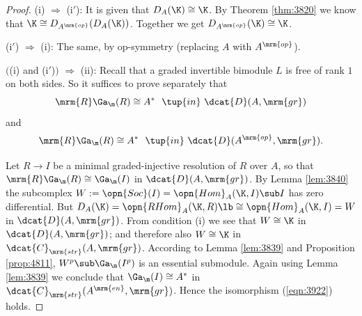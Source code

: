 \begin{proof} \mbox{}

\smallskip \noindent
(i) $\Rightarrow$ (i$'$): 
It is given that $D_A(\K) \cong \K$. 
By Theorem  \ref{thm:3820} we know that
$\K \cong D_{A^{\mrm{op}}}(D_A(\K))$. 
Together we get $D_{A^{\mrm{op}}}(\K) \cong \K$. 

\medskip \noindent 
(i$'$) $\Rightarrow$ (i): The same, by op-symmetry (replacing $A$ with 
$A^{\mrm{op}}$).

\medskip \noindent 
$\bigl($(i) and (i$'$)$\bigr)$ $\Rightarrow$ (ii):
Recall that a graded invertible bimodule $L$ is free of rank $1$ on both sides. 
So it suffices to prove separately that 
\begin{equation} \label{eqn:3922}
\mrm{R} \Ga_{\m}(R) \cong A^* \ \  \tup{in} \ \dcat{D}(A, \mrm{gr}) 
\end{equation}
and
\begin{equation} \label{eqn:3923}
\mrm{R} \Ga_{\m}(R) \cong A^* \ \ \tup{in} \ 
\dcat{D}(A^{\mrm{op}}, \mrm{gr}) .
\end{equation}

Let $R \to I$ be a minimal graded-injective resolution of $R$ over $A$, so that 
$\mrm{R} \Ga_{\m}(R) \cong \Ga_{\m}(I)$
in $\dcat{D}(A, \mrm{gr})$. 
By Lemma \ref{lem:3840} the subcomplex 
$W := \opn{Soc}(I) = \opn{Hom}_{A}(\K, I) \sub I$
has zero differential. But  
$D_A(\K) = \opn{RHom}_A(\K, R) \lb \cong \opn{Hom}_{A}(\K, I) = W$ 
in $\dcat{D}(A, \mrm{gr})$.
From condition (i) we see that $W \cong \K$ in 
$\dcat{D}(A, \mrm{gr})$; and therefore also 
$W \cong \K$ in $\dcat{C}_{\mrm{str}}(A, \mrm{gr})$.
According to Lemma \ref{lem:3839} and Proposition \ref{prop:4811}, 
$W^p \sub \Ga_{\m}(I^p)$ is an essential submodule.
Again using Lemma \ref{lem:3839} we conclude that 
$\Ga_{\m}(I) \cong A^*$ in $\dcat{C}_{\mrm{str}}(A^{\mrm{en}}, \mrm{gr})$. 
Hence the isomorphism (\ref{eqn:3922}) holds. 


\end{proof}
